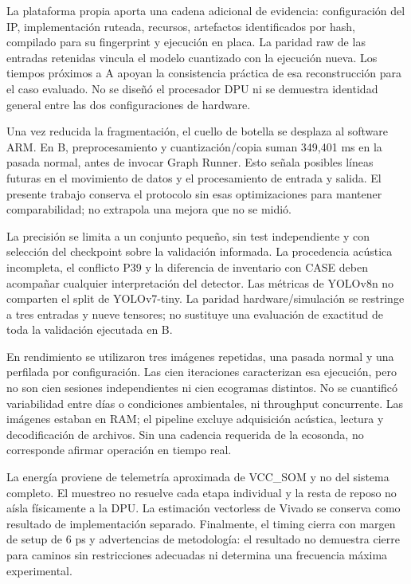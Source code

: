 \documentclass[10pt,conference,a4paper]{elektron}
\begin{document}
La plataforma propia aporta una cadena adicional de evidencia: configuración del IP, implementación ruteada, recursos, artefactos identificados por hash, compilado para su fingerprint y ejecución en placa. La paridad raw de las entradas retenidas vincula el modelo cuantizado con la ejecución nueva. Los tiempos próximos a A apoyan la consistencia práctica de esa reconstrucción para el caso evaluado. No se diseñó el procesador DPU ni se demuestra identidad general entre las dos configuraciones de hardware.

Una vez reducida la fragmentación, el cuello de botella se desplaza al software ARM. En B, preprocesamiento y cuantización/copia suman 349,401 ms en la pasada normal, antes de invocar Graph Runner. Esto señala posibles líneas futuras en el movimiento de datos y el procesamiento de entrada y salida. El presente trabajo conserva el protocolo sin esas optimizaciones para mantener comparabilidad; no extrapola una mejora que no se midió.

La precisión se limita a un conjunto pequeño, sin test independiente y con selección del checkpoint sobre la validación informada. La procedencia acústica incompleta, el conflicto P39 y la diferencia de inventario con CASE deben acompañar cualquier interpretación del detector. Las métricas de YOLOv8n no comparten el split de YOLOv7-tiny. La paridad hardware/simulación se restringe a tres entradas y nueve tensores; no sustituye una evaluación de exactitud de toda la validación ejecutada en B.

En rendimiento se utilizaron tres imágenes repetidas, una pasada normal y una perfilada por configuración. Las cien iteraciones caracterizan esa ejecución, pero no son cien sesiones independientes ni cien ecogramas distintos. No se cuantificó variabilidad entre días o condiciones ambientales, ni throughput concurrente. Las imágenes estaban en RAM; el pipeline excluye adquisición acústica, lectura y decodificación de archivos. Sin una cadencia requerida de la ecosonda, no corresponde afirmar operación en tiempo real.

La energía proviene de telemetría aproximada de VCC\_SOM y no del sistema completo. El muestreo no resuelve cada etapa individual y la resta de reposo no aísla físicamente a la DPU. La estimación vectorless de Vivado se conserva como resultado de implementación separado. Finalmente, el timing cierra con margen de setup de 6 ps y advertencias de metodología: el resultado no demuestra cierre para caminos sin restricciones adecuadas ni determina una frecuencia máxima experimental.
\end{document}
